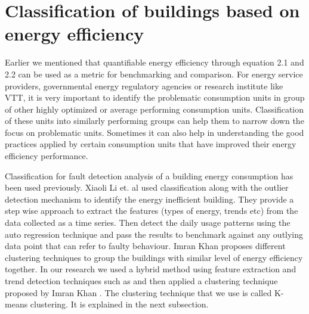 \section{Classification of buildings based on energy efficiency}\label{classify}

Earlier we mentioned that quantifiable energy efficiency through equation 2.1 and 2.2 can be used as a metric for benchmarking and comparison. For energy service providers, governmental energy regulatory agencies or research institute like VTT, it is very important to identify the problematic consumption units in group of other highly optimized or average performing consumption units. Classification of these units into similarly performing groups can help them to narrow down the focus on problematic units. Sometimes it can also help in understanding the good practices applied by certain consumption units that have improved their energy efficiency performance.
  
Classification for fault detection analysis of a building energy consumption has been used previously. Xiaoli Li et. al \cite{li2010classification} used classification along with the outlier detection mechanism to identify the energy inefficient building. They provide a step wise approach to extract the features (types of energy, trends etc) from the data collected as a time series. Then detect the daily usage patterns using the auto regression technique and pass the results to benchmark against any outlying data point that can refer to faulty behaviour. Imran Khan \cite{khan2013fault} proposes different clustering techniques to group the buildings with similar level of energy efficiency together. In our research we used a hybrid method using feature extraction and trend detection techniques such as \cite{li2010classification} and then applied a clustering technique proposed by Imran Khan \cite{khan2013fault}. The clustering technique that we use is called K-means clustering. It is explained in the next subsection. 

